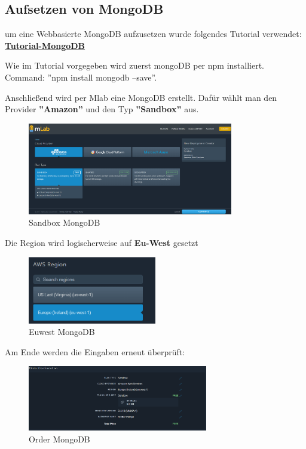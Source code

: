 \subsection{Aufsetzen von MongoDB}
um eine Webbasierte MongoDB aufzusetzen wurde folgendes Tutorial verwendet:\textbf{
\hyperlink{https://zellwk.com/blog/crud-express-mongodb/}{Tutorial-MongoDB}}

Wie im Tutorial vorgegeben wird zuerst mongoDB per npm installiert. Command: ''npm install mongodb --save''.

\clearpage	

Anschließend wird per Mlab eine MongoDB erstellt.
Dafür wählt man den Provider \textbf{''Amazon''} und den Typ \textbf{''Sandbox''} aus.
\begin{figure}[!h] 
	\centering
	\includegraphics[width=0.8\textwidth]{images/MlabSandbox.PNG}
	\caption{Sandbox MongoDB}
	\label{fig:Sandbox MongoDB}
\end{figure}

Die Region wird logischerweise auf \textbf{Eu-West} gesetzt
\begin{figure}[!h] 
	\centering
	\includegraphics[width=0.5\textwidth]{images/MlabRegion.PNG}
	\caption{Euwest MongoDB}
	\label{fig:Euwest MongoDB}
\end{figure}

Am Ende werden die Eingaben erneut überprüft:

\begin{figure}[!h] 
	\centering
	\includegraphics[width=0.7\textwidth]{images/mongodbfertig.PNG}
	\caption{Order MongoDB}
	\label{fig:Order MongoDB}
\end{figure}

